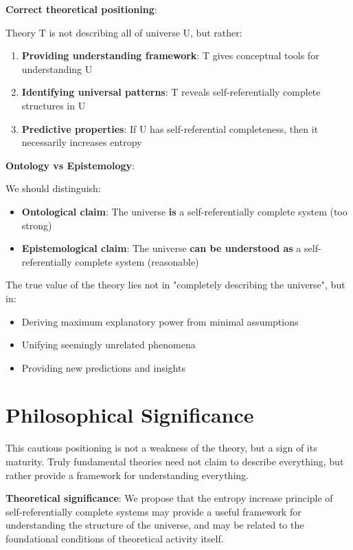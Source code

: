 \textbf{Correct theoretical positioning}:

Theory T is not describing all of universe U, but rather:
\begin{enumerate}
\item \textbf{Providing understanding framework}: T gives conceptual tools for understanding U
\item \textbf{Identifying universal patterns}: T reveals self-referentially complete structures in U
\item \textbf{Predictive properties}: If U has self-referential completeness, then it necessarily increases entropy
\end{enumerate}

\textbf{Ontology vs Epistemology}:

We should distinguish:
\begin{itemize}
\item \textbf{Ontological claim}: The universe \textbf{is} a self-referentially complete system (too strong)
\item \textbf{Epistemological claim}: The universe \textbf{can be understood as} a self-referentially complete system (reasonable)
\end{itemize}

The true value of the theory lies not in "completely describing the universe", but in:
\begin{itemize}
\item Deriving maximum explanatory power from minimal assumptions
\item Unifying seemingly unrelated phenomena
\item Providing new predictions and insights
\end{itemize}

\section{Philosophical Significance}
\label{sec:ch07_defense:philosophical-significance}

This cautious positioning is not a weakness of the theory, but a sign of its maturity. Truly fundamental theories need not claim to describe everything, but rather provide a framework for understanding everything.

\textbf{Theoretical significance}: We propose that the entropy increase principle of self-referentially complete systems may provide a useful framework for understanding the structure of the universe, and may be related to the foundational conditions of theoretical activity itself.

